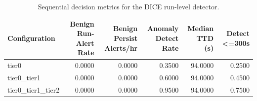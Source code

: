 \begin{table}[t]
\centering
\caption{Sequential decision metrics for the DICE run-level detector.}
\label{tab:dice_sequential_metrics}
\footnotesize
\begin{tabular}{lrrrrr}
\toprule
Configuration & Benign Run-Alert Rate & Benign Persist Alerts/hr & Anomaly Detect Rate & Median TTD (s) & Detect <=300s \\
\midrule
tier0 & 0.0000 & 0.0000 & 0.3500 & 94.0000 & 0.2500 \\
tier0_tier1 & 0.0000 & 0.0000 & 0.6000 & 94.0000 & 0.4500 \\
tier0_tier1_tier2 & 0.0000 & 0.0000 & 0.9500 & 94.0000 & 0.7500 \\
\bottomrule
\end{tabular}

\end{table}
